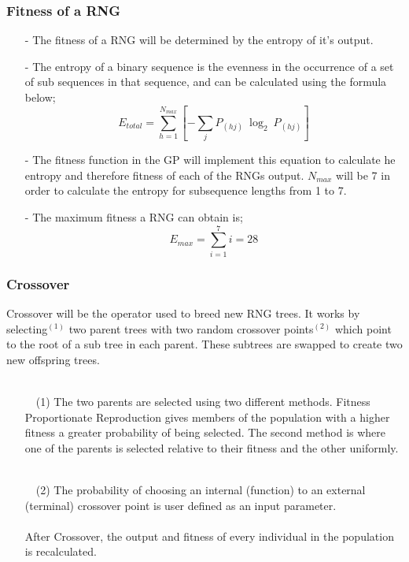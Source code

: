 \documentclass{beamer}
\begin{document}
\begin{frame}
\frametitle{Fitness of a RNG}
\begin{itemize}
\item[-]The fitness of a RNG will be determined by the entropy of it's output.
\item[-]The entropy of a binary sequence is the evenness in the occurrence of a set of sub sequences in that sequence, and can be calculated using the formula below;
\begin{equation*}
E_{total} = \sum_{h = 1}^{N_{max}} \left[ - \sum_{j} P_{(hj)}\ \log_2\ P_{(hj)} \right]
\end{equation*}
\item[-]The fitness function in the GP will implement this equation to calculate he entropy and therefore fitness of each of the RNGs output. $N_{max}$ will be 7 in order to calculate the entropy for subsequence lengths from 1 to 7. 
\item[-]The maximum fitness a RNG can obtain is; 
\begin{equation*}
E_{max}=\sum_{i = 1}^{7} i =28
\end{equation*}
\end{itemize}
\end{frame}

\begin{frame}
\frametitle{Crossover}
Crossover will be the operator used to breed new RNG trees. It works by selecting$^{(1)}$ two parent trees with two random crossover points$^{(2)}$ which point to the root of a sub tree in each parent. These subtrees are swapped to create two new offspring trees.\\~\\
\begin{itemize}
\item[\ \ (1)]The two parents are selected using two different methods. Fitness Proportionate Reproduction gives members of the population with a higher fitness a greater probability of being selected. The second method is where one of the parents is selected relative to their fitness and the other uniformly.\\~\\
\item[\ \ (2)]The probability of choosing an internal (function) to an external (terminal) crossover point is user defined as an input parameter.\\~\\
After Crossover, the output and fitness of every individual in the population is recalculated.
\end{itemize}
\end{frame}
\end{document}
